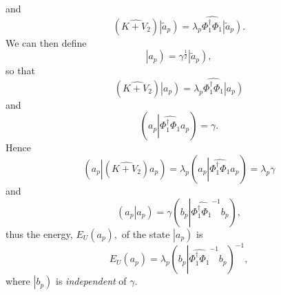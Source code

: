 \documentclass[aps,preprint]{revtex4}%
\begin{document}
and
\begin{equation}
\left(  \widehat{K+V_{2}}\right)  \left\vert \overset{}{\tilde{a}_{p}}\right)
=\lambda_{p}\widehat{\Phi_{1}^{\dagger}\Phi_{1}}\left\vert \overset{}%
{\tilde{a}_{p}}\right)  .
\end{equation}
We can then define
\begin{equation}
\left\vert \overset{}{a_{p}}\right)  =\gamma^{\frac{1}{2}}\left\vert
\overset{}{\tilde{a}_{p}}\right)  ,
\end{equation}
so that
\begin{equation}
\left(  \widehat{K+V_{2}}\right)  \left\vert \overset{}{a_{p}}\right)
=\lambda_{p}\widehat{\Phi_{1}^{\dagger}\Phi_{1}}\left\vert \overset{}{a_{p}%
}\right)
\end{equation}
and
\begin{equation}
\left(  a_{p}\left\vert \widehat{\Phi_{1}^{\dagger}\Phi_{1}}a_{p}\right.
\right)  =\gamma.
\end{equation}
Hence
\begin{equation}
\left(  \overset{}{a_{p}}\left\vert \left(  \widehat{K+V_{2}}\right)  \right.
\overset{}{a_{p}}\right)  =\lambda_{p}\left(  \overset{}{a_{p}}\left\vert
\widehat{\Phi_{1}^{\dagger}\Phi_{1}}\right.  \overset{}{a_{p}}\right)
=\lambda_{p}\gamma
\end{equation}
and
\begin{equation}
\left(  \overset{}{a_{p}}\left\vert \overset{}{a_{p}}\right.  \right)
=\gamma\left(  \overset{}{b_{p}}\left\vert \widehat{\Phi_{1}^{\dagger}\Phi
_{1}}^{-1}\overset{}{b_{p}}\right.  \right)  ,
\end{equation}
thus the energy, $E_{U}\left(  a_{p}\right)  ,$ of the state $\left\vert
\overset{}{a_{p}}\right)  $ is
\begin{equation}
E_{U}\left(  a_{p}\right)  =\lambda_{p}\left(  \overset{}{b_{p}}\left\vert
\widehat{\Phi_{1}^{\dagger}\Phi_{1}}^{-1}\overset{}{b_{p}}\right.  \right)
^{-1},
\end{equation}
where $\left\vert b_{p}\right)  $ is \emph{independent }of $\gamma$.
\end{document}
